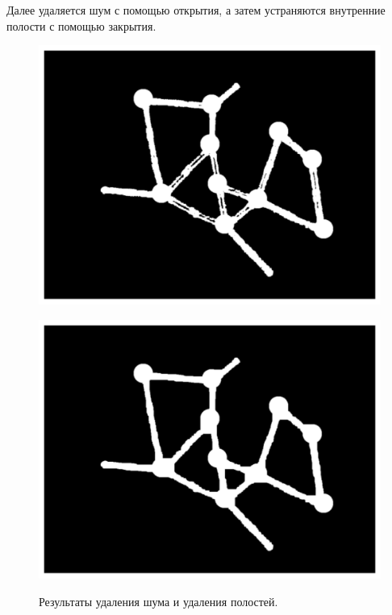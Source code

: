 \documentclass[10pt]{article}
\begin{document}
	
	Далее удаляется шум с помощью открытия, а затем устраняются внутренние полости с помощью закрытия.
	
	\begin{figure}[h]
		\begin{minipage}[h]{0.3\linewidth}
			\begin{center}
				{\includegraphics[width=1.0\linewidth]{data/expert_del_noise.pdf}}
			\end{center}
		\end{minipage}
		\hfill
		\begin{minipage}[h]{0.3\linewidth}
			\begin{center}
				{\includegraphics[width=1.0\linewidth]{data/expert_bin.pdf}}
			\end{center}
		\end{minipage}
		
		\caption{Результаты удаления шума и удаления полостей.}
		\label{ris:image7}
	\end{figure}
	
\end{document}
